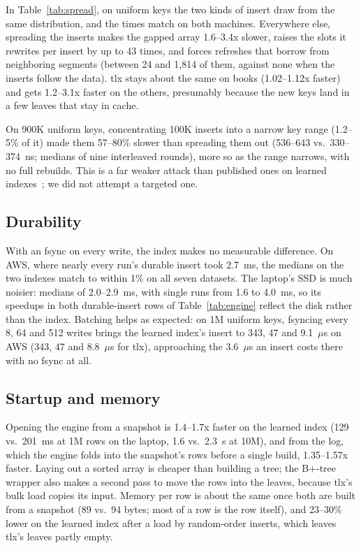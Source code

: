 \documentclass[conference]{IEEEtran}
\begin{document}
In Table~\ref{tab:spread}, on uniform keys the two kinds of insert draw from the
same distribution,
and the times match on both machines. Everywhere else, spreading the inserts
makes the gapped array 1.6--3.4x slower, raises the slots it rewrites per insert
by up to 43 times, and forces refreshes that borrow from neighboring segments
(between 24 and 1,814 of them, against none when the inserts follow the
data). tlx stays about the same on books (1.02--1.12x faster) and gets 1.2--3.1x
faster on the others, presumably because the new keys land in a few
leaves that stay in cache.

On 900K uniform keys, concentrating 100K inserts into a narrow key range (1.2--5\%
of it) made them 57--80\% slower than spreading them out (536--643 vs.\ 330--374~ns;
medians of nine interleaved rounds), more so as the range narrows,
with no full rebuilds. This is a far weaker attack than published ones on
learned indexes~\cite{yang2024}; we did not attempt a targeted one.

\subsection{Durability}

With an fsync on every write, the index makes no measurable difference. On
AWS, where nearly every run's durable insert took 2.7~ms, the medians on the two
indexes match to within 1\% on all seven datasets. The laptop's SSD is much
noisier: medians of 2.0--2.9~ms, with single runs from 1.6 to 4.0~ms, so its
speedups in both durable-insert rows of Table~\ref{tab:engine} reflect the disk
rather than the index.
Batching helps as expected: on 1M uniform keys, fsyncing every 8, 64 and 512
writes brings the learned index's insert to 343, 47 and 9.1~$\mu$s on AWS (343,
47 and 8.8~$\mu$s for tlx), approaching the 3.6~$\mu$s an insert costs there with
no fsync at all.

\subsection{Startup and memory}

Opening the engine from a snapshot is 1.4--1.7x faster on the learned
index (129 vs.\ 201~ms at 1M rows on the laptop, 1.6 vs.\ 2.3~s at 10M),
and from the log, which the engine folds into the snapshot's rows before a
single build, 1.35--1.57x faster. Laying out a sorted array is cheaper than
building a tree; the B+-tree wrapper also makes a second pass to move the
rows into the leaves, because tlx's bulk load copies its input. Memory
per row is about the same once both are built from a snapshot (89 vs.\
94 bytes; most of a row is the row itself), and 23--30\% lower on the
learned index after a load by random-order inserts, which leaves tlx's
leaves partly empty.
\end{document}
